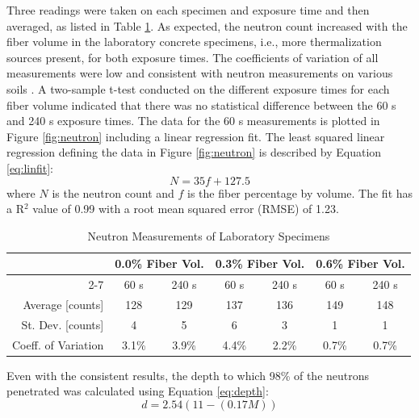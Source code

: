 \documentclass[9pt,twocolumn,twoside]{iscp}
\begin{document}
Three readings were taken on each specimen and exposure time and then averaged, as listed in Table \ref{tab:counts}. As expected, the neutron count increased with the fiber volume in the laboratory concrete specimens, i.e., more thermalization sources present, for both exposure times. The coefficients of variation of all measurements were low and consistent with neutron measurements on various soils \citep{and1995a}. A two-sample t-test conducted on the different exposure times for each fiber volume indicated that there was no statistical difference between the 60 s and 240 s exposure times. The data for the 60 s measurements is plotted in Figure \ref{fig:neutron} including a linear regression fit. The least squared linear regression defining the data in Figure \ref{fig:neutron} is described by Equation \ref{eq:linfit}:
\begin{equation}
    \label{eq:linfit}
    N=35f+127.5
\end{equation}
where $N$ is the neutron count and $f$ is the fiber percentage by volume. The fit has a R$^2$ value of 0.99 with a root mean squared error (RMSE) of 1.23. 

\begin{table}%
\centering
\caption{Neutron Measurements of Laboratory Specimens}
\label{tab:counts}
\begin{tabular}{rcccccc}
\multicolumn{1}{l}{} & \multicolumn{2}{c}{0.0\% Fiber Vol.} & \multicolumn{2}{c}{0.3\% Fiber Vol.} & \multicolumn{2}{c}{0.6\% Fiber Vol.} \\ \cline{2-7} 
\multicolumn{1}{l}{} & 60 s & 240 s & 60 s & 240 s & 60 s & 240 s \\
\midrule
Average {[}counts{]} & 128 & 129 & 137 & 136 & 149 & 148 \\
St. Dev. {[}counts{]} & 4 & 5 & 6 & 3 & 1 & 1 \\
Coeff. of Variation & 3.1\% & 3.9\% & 4.4\% & 2.2\% & 0.7\% & 0.7\%\\
\bottomrule
\end{tabular}
\end{table}

Even with the consistent results, the depth to which 98\% of the neutrons penetrated was calculated using Equation \ref{eq:depth}:
\begin{equation}
    \label{eq:depth}
    d=2.54\left(11-\left(0.17M\right)\right)
\end{equation}
\end{document}
